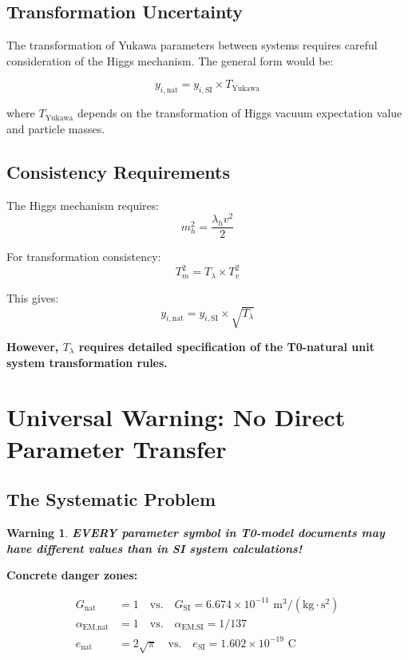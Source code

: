 \documentclass[12pt,a4paper]{article}
\newcommand{\lambdah}{\lambda_h}
\newcommand{\pichar}{\pi}
\newtheorem{warning}[theorem]{Warning}
\begin{document}
	\subsection{Transformation Uncertainty}
	\label{subsec:yukawa_transformation}
	
	The transformation of Yukawa parameters between systems requires careful consideration of the Higgs mechanism. The general form would be:
	
	$$y_{i,\text{nat}} = y_{i,\text{SI}} \times T_{\text{Yukawa}}$$
	
	where $T_{\text{Yukawa}}$ depends on the transformation of Higgs vacuum expectation value and particle masses.
	
	\subsection{Consistency Requirements}
	\label{subsec:yukawa_consistency}
	
	The Higgs mechanism requires:
	$$m_h^2 = \frac{\lambdah v^2}{2}$$
	
	For transformation consistency:
	$$T_m^2 = T_\lambda \times T_v^2$$
	
	This gives:
	$$y_{i,\text{nat}} = y_{i,\text{SI}} \times \sqrt{T_\lambda}$$
	
	\textbf{However, $T_\lambda$ requires detailed specification of the T0-natural unit system transformation rules.}
	
	\section{Universal Warning: No Direct Parameter Transfer}
	\label{sec:universal_warning}
	
	\subsection{The Systematic Problem}
	\label{subsec:systematic_problem}
	
	\begin{warning}
		\textbf{EVERY parameter symbol in T0-model documents may have different values than in SI system calculations!}
	\end{warning}
	
	\textbf{Concrete danger zones:}
	
	\begin{align}
		G_{\text{nat}} &= 1 \quad \text{vs.} \quad G_{\text{SI}} = 6.674 \times 10^{-11} \text{ m}^3/(\text{kg} \cdot \text{s}^2) \\
		\alpha_{\text{EM,nat}} &= 1 \quad \text{vs.} \quad \alpha_{\text{EM,SI}} = 1/137 \\
		e_{\text{nat}} &= 2\sqrt{\pichar} \quad \text{vs.} \quad e_{\text{SI}} = 1.602 \times 10^{-19} \text{ C}
	\end{align}
	
\end{document}
